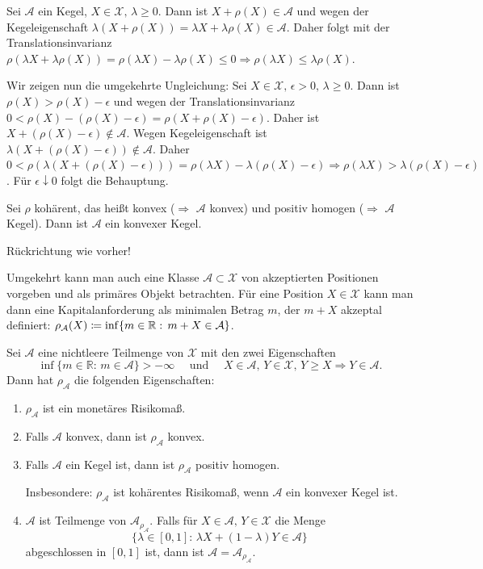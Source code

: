 \documentclass[a4paper,twoside,DIV15,BCOR12mm]{scrbook}
\begin{document}
\begin{beweis}
\begin{enumerate}
Sei $\mathcal{A}$ ein Kegel, $X\in\mathcal{X},\, \lambda\geq 0$. Dann ist $X+\rho(X)\in\mathcal{A}$ und wegen der Kegeleigenschaft $\lambda(X+\rho(X))=\lambda X+\lambda \rho(X)\in\mathcal{A}$. Daher folgt mit der Translationsinvarianz $\rho(\lambda X+\lambda \rho(X))=\rho(\lambda X)-\lambda \rho(X)\leq 0 \Rightarrow \rho(\lambda X)\leq \lambda \rho(X)$.

Wir zeigen nun die umgekehrte Ungleichung: Sei $X\in\mathcal{X},\, \epsilon>0,\, \lambda\geq 0$. Dann ist $\rho(X)>\rho(X)-\epsilon$ und wegen der Translationsinvarianz $0<\rho(X)-(\rho(X)-\epsilon)=\rho(X+\rho(X)-\epsilon)$. Daher ist $X+(\rho(X)-\epsilon)\notin\mathcal{A}$. Wegen Kegeleigenschaft ist $\lambda(X+(\rho(X)-\epsilon))\notin\mathcal{A}$. Daher $0<\rho(\lambda(X+(\rho(X)-\epsilon)))=\rho(\lambda X)-\lambda(\rho(X)-\epsilon) \Rightarrow \rho(\lambda X)>\lambda(\rho(X)-\epsilon)$. Für $\epsilon \downarrow 0$ folgt die Behauptung.

Sei $\rho$ kohärent, das heißt konvex ($\Rightarrow$ $\mathcal{A}$ konvex) und positiv homogen ($\Rightarrow$ $\mathcal{A}$ Kegel). Dann ist $\mathcal{A}$ ein konvexer Kegel.

Rückrichtung wie vorher!
\end{enumerate}
\end{beweis}

Umgekehrt kann man auch eine Klasse $\mathcal{A}\subset \mathcal{X}$ von akzeptierten Positionen vorgeben und als primäres Objekt betrachten. Für eine Position $X\in\mathcal{X}$ kann man dann eine Kapitalanforderung als minimalen Betrag $m$, der $m+X$ akzeptal definiert: $\rho_\mathcal{A}(X)\da\inf\{m\in\mathbb{R}:\, m+X\in\mathcal{A}\}$.

\begin{satz}
Sei $\mathcal{A}$ eine nichtleere Teilmenge von $\mathcal{X}$ mit den zwei Eigenschaften
\[
\inf\{m\in\mathbb{R}:\, m\in\mathcal{A}\}>-\infty \quad \text{ und } \quad X\in\mathcal{A},\, Y\in\mathcal{X},\, Y\geq X \Rightarrow Y\in\mathcal{A}.
\]
Dann hat $\rho_\mathcal{A}$ die folgenden Eigenschaften:
\begin{enumerate}
\item $\rho_\mathcal{A}$ ist ein monetäres Risikomaß.
\item Falls $\mathcal{A}$ konvex, dann ist $\rho_\mathcal{A}$ konvex.
\item Falls $\mathcal{A}$ ein Kegel ist, dann ist $\rho_\mathcal{A}$ positiv homogen.

Insbesondere: $\rho_\mathcal{A}$ ist kohärentes Risikomaß, wenn $\mathcal{A}$ ein konvexer Kegel ist.
\item $\mathcal{A}$ ist Teilmenge von $\mathcal{A}_{\rho_\mathcal{A}}$. Falls für $X\in\mathcal{A},\, Y\in\mathcal{X}$ die Menge 
\[
\{\lambda\in [0, 1]:\, \lambda X+(1-\lambda)Y\in\mathcal{A}\}
\]
abgeschlossen in $[0, 1]$ ist, dann ist $\mathcal{A}=\mathcal{A}_{\rho_\mathcal{A}}$.
\end{enumerate}
\end{satz}
\end{document}
